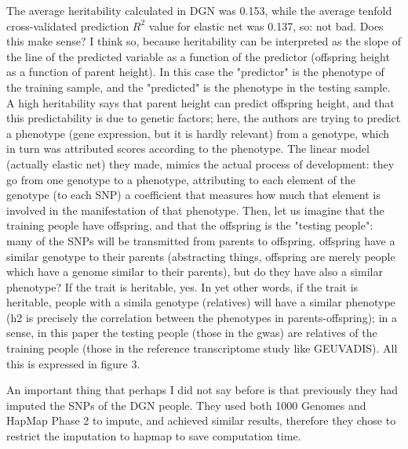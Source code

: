 \documentclass[../main.tex]{subfiles}
\begin{document}
The average heritability calculated in DGN was 0.153, while the average 
tenfold cross-validated prediction $R^2$ value for elastic net was 
0.137, so: not bad. Does this make sense? I think so, because 
  heritability can be interpreted as the slope of the line of the 
predicted variable as a function of the predictor (\eg offspring height 
as a function of parent height). In this case the "predictor" is the 
phenotype of the training sample, and the "predicted" is the phenotype 
in the testing sample. A high heritability says that parent height can 
predict offspring height, and that this predictability is due to genetic 
factors; here, the authors are trying to predict a phenotype (gene 
expression, but it is hardly relevant) from a genotype, which in turn 
was attributed scores according to the phenotype. The linear model 
(actually elastic net) they made, mimics the actual process of 
development: they go from one genotype to a phenotype, attributing to 
each element of the genotype (\ie to each SNP) a coefficient that 
measures how much that element is involved in the manifestation of that 
phenotype. Then, let us imagine that the training people have offspring, 
and that the offspring is the "testing people": many of the SNPs will be 
transmitted from parents to offspring. offspring have a similar genotype 
to their parents (abstracting things, offspring are merely people which 
have a genome similar to their parents), but do they have also a similar 
phenotype? If the trait is heritable, yes. In yet other words, if the 
trait is heritable, people with a simila genotype (\ie relatives) will 
have a similar phenotype (h2 is precisely the correlation between the 
phenotypes in parents-offspring); in a sense, in this paper the testing 
people (those in the gwas) are relatives of the training people (those 
in the reference transcriptome study like GEUVADIS). All this is 
expressed in figure 3.

An important thing that perhaps I did not say before is that previously 
they had imputed the SNPs of the DGN people. They used both 1000 Genomes 
and HapMap Phase 2 to impute, and achieved similar results, therefore 
they chose to restrict the imputation to hapmap to save computation 
time.
\end{document}
